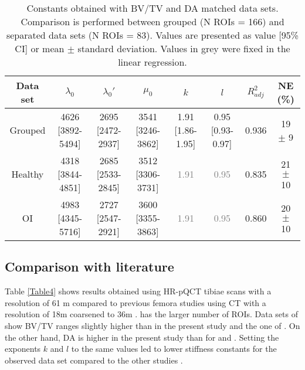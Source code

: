 \documentclass[a4paper,fleqn]{DC_ArtStyle}
\begin{document}
	\begin{table*}[b]
		\caption{Constants obtained with BV/TV and DA matched data sets. Comparison is performed between grouped (N ROIs = 166) and separated data sets (N ROIs = 83). Values are presented as value [95\% CI] or mean $\pm$ standard deviation. Values in grey were fixed in the linear regression.}
		\label{Table3}
		\begin{tabular}{cccccccc}
			\toprule
			Data set & $\lambda_0$ & $\lambda_0'$ & $\mu_0$ & $k$ & $l$ & $R^2_{adj}$ & NE (\%) \\
			\midrule
			Grouped & 4626 [3892-5494] & 2695 [2472-2937] & 3541 [3246-3862] & 1.91 [1.86-1.95] & 0.95 [0.93-0.97] & 0.936 & 19 $\pm$ 9\\
			
			Healthy & 4318 [3844-4851] & 2685 [2533-2845] & 3512 [3306-3731] & \textcolor{gray}{1.91} & \textcolor{gray}{0.95} & 0.835 & 21 $\pm$ 10\\
			
			OI & 4983 [4345-5716] & 2727 [2547-2921] & 3600 [3355-3863] & \textcolor{gray}{1.91} & \textcolor{gray}{0.95} & 0.860 & 20 $\pm$ 10\\
			\bottomrule
		\end{tabular}
	\end{table*}
	
	\subsection{Comparison with literature}
	Table \ref{Table4} shows results obtained using HR-pQCT tibiae scans with a resolution of 61 \si{\micro}m compared to previous femora studies using \si{\micro}CT with a resolution of 18\si{\micro}m coarsened to 36\si{\micro}m \cite{Gross2013,Panyasantisuk2015}. \citeauthor{Gross2013} \cite{Gross2013} has the larger number of ROIs. Data sets of \citeauthor{Panyasantisuk2015} \cite{Panyasantisuk2015} show BV/TV ranges slightly higher than in the present study and the one of \citeauthor{Gross2013} \cite{Gross2013}. On the other hand, DA is higher in the present study than for \citeauthor{Panyasantisuk2015} \cite{Panyasantisuk2015} and \citeauthor{Gross2013} \cite{Gross2013}. Setting the exponents $k$ and $l$ to the same values led to lower stiffness constants for the observed data set compared to the other studies \cite{Gross2013,Panyasantisuk2015}.\\
	
\end{document}
